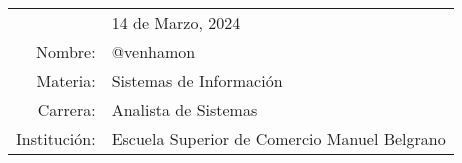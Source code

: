 
\hfill
\begin{tabular}{rl @{}}
	$ $ &
	14 de Marzo, 2024
	\bigskip\\ %
Nombre:     &
@venhamon
\\
Materia:     & Sistemas de Información  \\
Carrera: & Analista de Sistemas \\
Institución:    & Escuela Superior de Comercio Manuel Belgrano  \\
\end{tabular}
\bigskip %

\pagestyle{plain}
\renewcommand{\baselinestretch}{0.65}\normalsize
\tableofcontents
\renewcommand{\baselinestretch}{1.0}\normalsize

\clearpage
